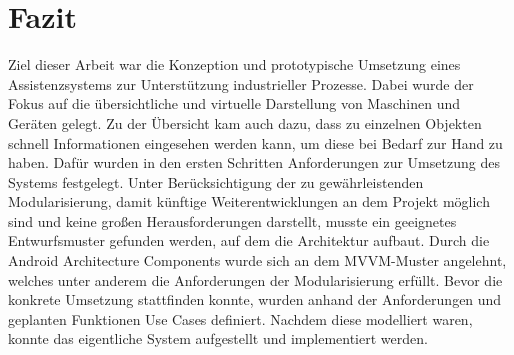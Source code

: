 \chapter{Fazit}
\label{chap:Fazit}
Ziel dieser Arbeit war die Konzeption und prototypische Umsetzung eines Assistenzsystems zur Unterstützung industrieller Prozesse. Dabei wurde der Fokus auf die 
übersichtliche und virtuelle Darstellung von Maschinen und Geräten gelegt. Zu der Übersicht kam auch dazu, dass zu einzelnen Objekten schnell Informationen eingesehen 
werden kann, um diese bei Bedarf zur Hand zu haben. Dafür wurden in den ersten Schritten Anforderungen zur Umsetzung des Systems festgelegt. Unter Berücksichtigung der 
zu gewährleistenden Modularisierung, damit künftige Weiterentwicklungen an dem Projekt möglich sind und keine großen Herausforderungen darstellt, musste ein geeignetes 
Entwurfsmuster gefunden werden, auf dem die Architektur aufbaut. Durch die Android Architecture Components wurde sich an dem MVVM-Muster angelehnt, welches unter anderem 
die Anforderungen der Modularisierung erfüllt. Bevor die konkrete Umsetzung stattfinden konnte, wurden anhand der Anforderungen und geplanten Funktionen Use Cases 
definiert. Nachdem diese modelliert waren, konnte das eigentliche System aufgestellt und implementiert werden. 
